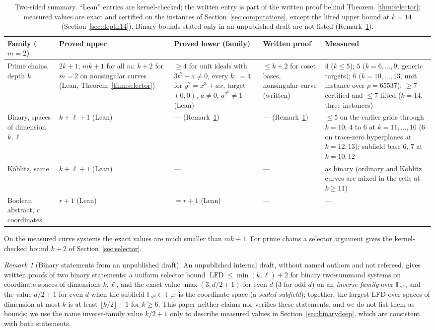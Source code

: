 \documentclass[11pt]{article}
\theoremstyle{definition}\newtheorem{definition}[theorem]{Definition}
\theoremstyle{remark}\newtheorem{remark}[theorem]{Remark}
\newcommand{\F}{\mathbb F}
\newcommand{\lfd}{\operatorname{LFD}}
\begin{document}
\begin{table}[htbp]
\centering\scriptsize
\setlength{\tabcolsep}{3pt}\begin{tabular}{p{2.0cm}p{2.6cm}p{4.0cm}p{2.5cm}p{3.4cm}}
\toprule
Family ($m=2$) & Proved upper & Proved lower (family) & Written proof & Measured\\
\midrule
Prime chains, depth $k$ & $2k+1$; $mk+1$ for all $m$; $k+2$ for $m=2$ on nonsingular curves (Lean, Theorem~\ref{thm:selector}) & $\ge4$ for unit ideals with $3t^2+a\ne0$, every $k$; $=4$ for $y^2=x^3+ax$, target $(0,0)$, $a\ne0$, $a^{2^k}\ne1$ (Lean) & $\le k+2$ for coset bases, nonsingular curve (written) & $4$ ($k\le5$); $5$ ($k=6,\ldots,9$, generic targets); $6$ ($k=10,\ldots,13$, unit instance over $p=65537$); $\ge7$ certified and $\le7$ lifted ($k=14$, three instances)\\
Binary, spaces of dimension $k,\ell$ & $k+\ell+1$ (Lean) & --- (Remark~\ref{rem:binarydraft}) & --- (Remark~\ref{rem:binarydraft}) & $\le5$ on the earlier grids through $k=10$; $4$ to $6$ at $k=11,\ldots,16$ ($6$ on trace-zero hyperplanes at $k=12,13$); subfield base $6$, $7$ at $k=10,12$\\
Koblitz, same & $k+\ell+1$ (Lean) & --- & --- & as binary (ordinary and Koblitz curves are mixed in the cells at $k\ge11$)\\
Boolean abstract, $r$ coordinates & $r+1$ (Lean) & $=r+1$ (Lean) & --- & ---\\
\bottomrule
\end{tabular}
\caption{Two-sided summary. ``Lean'' entries are kernel-checked; the
written entry is part of the written proof behind
Theorem~\ref{thm:selector}; measured values are exact and certified on the
instances of Section~\ref{sec:computations}, except the lifted upper bound
at $k=14$ (Section~\ref{sec:depth14}). Binary bounds stated only in an
unpublished draft are not listed (Remark~\ref{rem:binarydraft}).}
\label{tab:twosided}
\end{table}

On the measured curve systems the exact values are much smaller than
$mk+1$. For prime chains a selector argument gives the kernel-checked bound
$k+2$ of Section~\ref{sec:selector}.

\begin{remark}[Binary statements from an unpublished draft]\label{rem:binarydraft}
An unpublished internal draft, without named authors and not refereed,
gives written proofs of two binary statements: a uniform selector bound
$\lfd\le\min(k,\ell)+2$ for binary two-summand systems on coordinate spaces
of dimensions $k,\ell$, and the exact value $\max(3,d/2+1)$ for even $d$
($3$ for odd $d$) on an \emph{inverse family} over $\F_{2^d}$, and the
value $d/2+1$ for even $d$ when the subfield $\F_{2^d}\subset\F_{2^{2d}}$ is
the coordinate space (a \emph{scaled subfield}); together, the largest LFD over spaces of dimension
at most $k$ is at least $\lfloor k/2\rfloor+1$ for $k\ge6$. This paper
neither claims nor verifies these statements, and we do not list them as
bounds; we use the name inverse-family value $k/2+1$ only to describe
measured values in Section~\ref{sec:binarydeep}, which are consistent with
both statements.
\end{remark}
\end{document}
